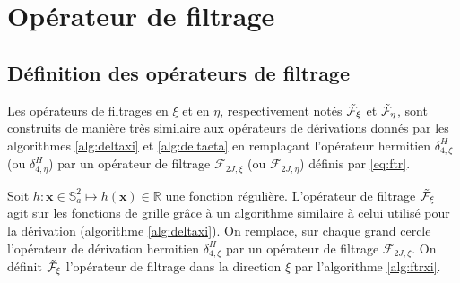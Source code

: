 \section{Opérateur de filtrage}

\subsection{Définition des opérateurs de filtrage}

Les opérateurs de filtrages en $\xi$ et en $\eta$, respectivement notés $\tilde{\mathcal{F}}_{\xi}$ et $\tilde{\mathcal{F}}_{\eta}$, sont construits de manière très similaire aux opérateurs de dérivations donnés par les algorithmes \ref{alg:deltaxi} et \ref{alg:deltaeta} en remplaçant l'opérateur hermitien $\delta^H_{4,\xi}$ (ou $\delta^H_{4,\eta}$) par un opérateur de filtrage $\mathcal{F}_{2J,\xi}$ (ou $\mathcal{F}_{2J,\eta}$) définis par \eqref{eq:ftr}.

Soit $h : \mathbf{x} \in \mathbb{S}_a^2 \mapsto h(\mathbf{x}) \in \mathbb{R}$ une fonction régulière. L'opérateur de filtrage $\tilde{\mathcal{F}}_{\xi}$ agit sur les fonctions de grille grâce à un algorithme similaire à celui utilisé pour la dérivation (algorithme  \ref{alg:deltaxi}). On remplace, sur chaque grand cercle l'opérateur de dérivation hermitien $\delta_{4,\xi}^H$ par un opérateur de filtrage $\mathcal{F}_{2J,\xi}$. On définit $\tilde{\mathcal{F}}_{\xi}$ l'opérateur de filtrage dans la direction $\xi$ par l'algorithme \ref{alg:ftrxi}.

